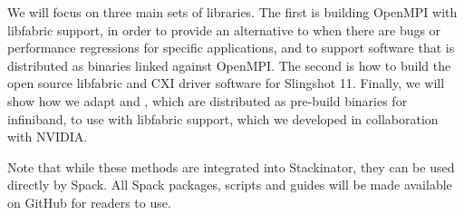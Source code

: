 We will focus on three main sets of libraries. The first is building OpenMPI with libfabric support, in order to provide an alternative to \craympich when there are bugs or performance regressions for specific applications, and to support software that is distributed as binaries linked against OpenMPI. The second is how to build the open source libfabric and CXI driver software for Slingshot 11. Finally, we will show how we adapt \cufftmp and \cusolvermp, which are distributed as pre-build binaries for infiniband, to use \nvshmem with libfabric support, which we developed in collaboration with NVIDIA.

Note that while these methods are integrated into Stackinator, they can be used directly by Spack. All Spack packages, scripts and guides will be made available on GitHub for readers to use.
